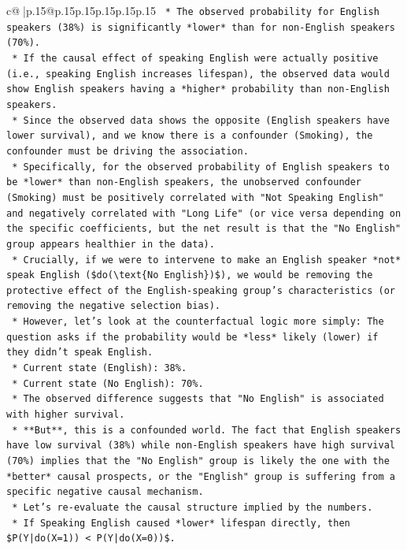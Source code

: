 \documentclass{article}
\begin{document}
{\begin{supertabular}{c@{$\;$}|p{.15\linewidth}@{}p{.15\linewidth}p{.15\linewidth}p{.15\linewidth}p{.15\linewidth}p{.15\linewidth}}
{{{\texttt{    *   The observed probability for English speakers (38\%) is significantly *lower* than for non{-}English speakers (70\%).} \\
\texttt{    *   If the causal effect of speaking English were actually positive (i.e., speaking English increases lifespan), the observed data would show English speakers having a *higher* probability than non{-}English speakers.} \\
\texttt{    *   Since the observed data shows the opposite (English speakers have lower survival), and we know there is a confounder (Smoking), the confounder must be driving the association.} \\
\texttt{    *   Specifically, for the observed probability of English speakers to be *lower* than non{-}English speakers, the unobserved confounder (Smoking) must be positively correlated with "Not Speaking English" and negatively correlated with "Long Life" (or vice versa depending on the specific coefficients, but the net result is that the "No English" group appears healthier in the data).} \\
\texttt{    *   Crucially, if we were to intervene to make an English speaker *not* speak English (\$do(\textbackslash{}text\{No English\})\$), we would be removing the protective effect of the English{-}speaking group's characteristics (or removing the negative selection bias).} \\
\texttt{    *   However, let's look at the counterfactual logic more simply: The question asks if the probability would be *less* likely (lower) if they didn't speak English.} \\
\texttt{    *   Current state (English): 38\%.} \\
\texttt{    *   Current state (No English): 70\%.} \\
\texttt{    *   The observed difference suggests that "No English" is associated with higher survival.} \\
\texttt{    *   **But**, this is a confounded world. The fact that English speakers have low survival (38\%) while non{-}English speakers have high survival (70\%) implies that the "No English" group is likely the one with the *better* causal prospects, or the "English" group is suffering from a specific negative causal mechanism.} \\
\texttt{    *   Let's re{-}evaluate the causal structure implied by the numbers.} \\
\texttt{        *   If Speaking English caused *lower* lifespan directly, then \$P(Y|do(X=1)) < P(Y|do(X=0))\$.} \\
}}}
\end{supertabular}}
\end{document}
